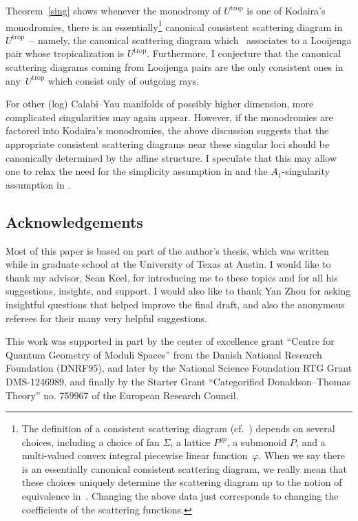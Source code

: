 \documentclass[10pt,a4paper]{amsart}
\numberwithin{equation}{section}
\numberwithin{figure}{section}
\numberwithin{table}{section}
\DeclareMathOperator{\trop}{trop}
\theoremstyle{definition}
\begin{document}
Theorem~\ref{sing} shows whenever the monodromy of $U^{\trop}$ is one of Kodaira's monodromies, there is an essentially\footnote{The definition of a consistent scattering diagram (cf.~\cite{GHK1}) depends on several choices, including a choice of fan $\Sigma$, a lattice $P^{gp}$, a submonoid $P$, and a multi-valued convex integral piecewise linear function~$\varphi$. When we say there is an essentially canonical consistent scattering diagram, we really mean that these choices uniquely determine the scattering diagram up to the notion of equivalence in~\cite{GPS}. Changing the above data just corresponds to changing the coefficients of the scattering functions.} canonical consistent scattering diagram in $U^{\trop}$~-- namely, the cano\-ni\-cal scattering diagram which~\cite{GHK1} associates to a Looijenga pair whose tropicalization is $U^{\trop}$. Furthermore, I conjecture that the canonical scattering diagrams coming from Looijenga pairs are the only consistent ones in any~$U^{\trop}$ which consist only of outgoing rays.

For other (log) Calabi--Yau manifolds of possibly higher dimension, more complicated singularities may again appear. However, if the monodromies are factored into Kodaira's mono\-dromies, the above discussion suggests that the appropriate consistent scattering diagrams near these singular loci should be canonically determined by the affine structure. I speculate that this may allow one to relax the need for the simplicity assumption in \cite{GS11} and the $A_1$-singularity assumption in \cite{WCS}.

\subsection*{Acknowledgements}

Most of this paper is based on part of the author's thesis, which was written while in graduate school at the University of Texas at Austin. I would like to thank my advisor, Sean Keel, for introducing me to these topics and for all his suggestions, insights, and support. I would also like to thank Yan Zhou for asking insightful questions that helped improve the final draft, and also the anonymous referees for their many very helpful suggestions.

This work was supported in part by the center of excellence grant ``Centre for Quantum Geometry of Moduli Spaces'' from the Danish National Research Foundation (DNRF95), and later by the National Science Foundation RTG Grant DMS-1246989, and finally by the Starter Grant ``Categorified Donaldson--Thomas Theory'' no. 759967 of the European Research Council.
\end{document}
